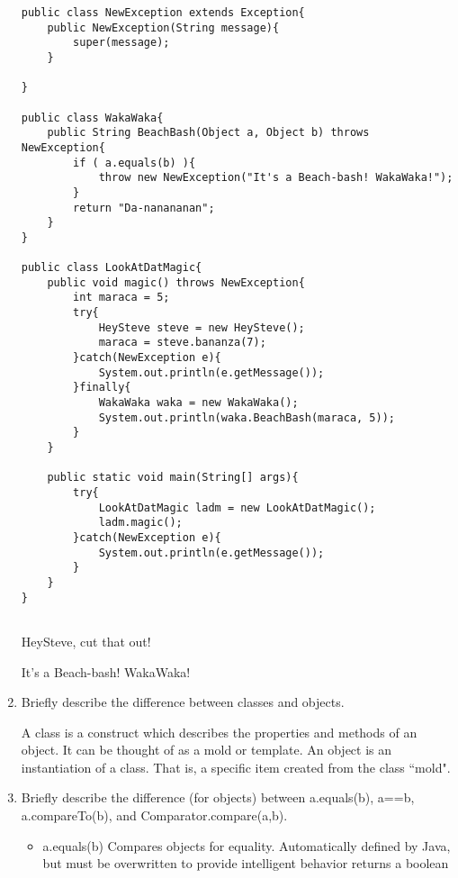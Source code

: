 \documentclass[11pt]{article}
\newenvironment{answer}{\large\lstset{basicstyle=\large}\color{white}}{}
\newenvironment{answer}{\large\lstset{basicstyle=\large}\color{red}}{}
\begin{document}
\begin{enumerate}
\begin{lstlisting}
public class NewException extends Exception{
    public NewException(String message){
        super(message);
    }

}
           
public class WakaWaka{
    public String BeachBash(Object a, Object b) throws NewException{
        if ( a.equals(b) ){
            throw new NewException("It's a Beach-bash! WakaWaka!");
        }
        return "Da-nanananan";
    }
}

public class LookAtDatMagic{
    public void magic() throws NewException{
        int maraca = 5;
        try{
            HeySteve steve = new HeySteve();
            maraca = steve.bananza(7);
        }catch(NewException e){
            System.out.println(e.getMessage());
        }finally{
            WakaWaka waka = new WakaWaka();
            System.out.println(waka.BeachBash(maraca, 5));
        }
    }

    public static void main(String[] args){
        try{
            LookAtDatMagic ladm = new LookAtDatMagic();
            ladm.magic();
        }catch(NewException e){
            System.out.println(e.getMessage());
        }
    }
}


\end{lstlisting}
\begin{answer}
HeySteve, cut that out!


It's a Beach-bash! WakaWaka!
\end{answer}
\pagebreak
\item Briefly describe the difference between classes and objects.

    \begin{answer}
    A class is a construct which describes the properties and methods of an
    object. It can be thought of as a mold or template. An object is an 
    instantiation of a class. That is, a specific item created from the class
    ``mold".
    \end{answer}

\item Briefly describe the difference (for objects) between a.equals(b), a==b,
      a.compareTo(b), and Comparator.compare(a,b).

    \begin{answer}
    \begin{itemize}

    \item a.equals(b) Compares objects for equality. Automatically defined
    by Java, but must be overwritten to provide intelligent behavior
    returns a boolean


\end{itemize}
\end{answer}
\end{enumerate}
\end{document}
